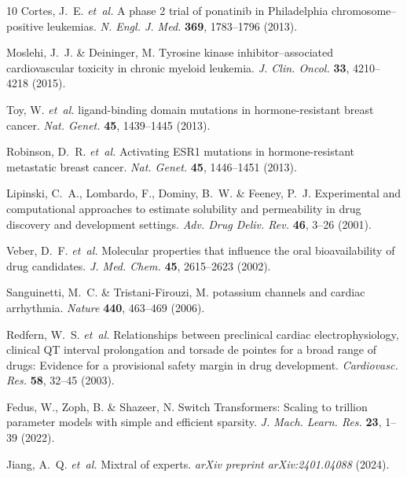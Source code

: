 \documentclass[11pt,a4paper]{article}
\begin{document}
\begin{thebibliography}{10}
Cortes, J.~E. \emph{et~al.}
\newblock A phase 2 trial of ponatinib in {Philadelphia} chromosome--positive leukemias.
\newblock \emph{N. Engl. J. Med.} \textbf{369}, 1783--1796 (2013).

Moslehi, J.~J. \& Deininger, M.
\newblock Tyrosine kinase inhibitor--associated cardiovascular toxicity in chronic myeloid leukemia.
\newblock \emph{J. Clin. Oncol.} \textbf{33}, 4210--4218 (2015).

Toy, W. \emph{et~al.}
 ligand-binding domain mutations in hormone-resistant breast cancer.
\newblock \emph{Nat. Genet.} \textbf{45}, 1439--1445 (2013).

Robinson, D.~R. \emph{et~al.}
\newblock Activating {ESR1} mutations in hormone-resistant metastatic breast cancer.
\newblock \emph{Nat. Genet.} \textbf{45}, 1446--1451 (2013).

Lipinski, C.~A., Lombardo, F., Dominy, B.~W. \& Feeney, P.~J.
\newblock Experimental and computational approaches to estimate solubility and permeability in drug discovery and development settings.
\newblock \emph{Adv. Drug Deliv. Rev.} \textbf{46}, 3--26 (2001).

Veber, D.~F. \emph{et~al.}
\newblock Molecular properties that influence the oral bioavailability of drug candidates.
\newblock \emph{J. Med. Chem.} \textbf{45}, 2615--2623 (2002).

Sanguinetti, M.~C. \& Tristani-Firouzi, M.
 potassium channels and cardiac arrhythmia.
\newblock \emph{Nature} \textbf{440}, 463--469 (2006).

Redfern, W.~S. \emph{et~al.}
\newblock Relationships between preclinical cardiac electrophysiology, clinical {QT} interval prolongation and torsade de pointes for a broad range of drugs: Evidence for a provisional safety margin in drug development.
\newblock \emph{Cardiovasc. Res.} \textbf{58}, 32--45 (2003).

Fedus, W., Zoph, B. \& Shazeer, N.
\newblock Switch Transformers: Scaling to trillion parameter models with simple and efficient sparsity.
\newblock \emph{J. Mach. Learn. Res.} \textbf{23}, 1--39 (2022).

Jiang, A.~Q. \emph{et~al.}
\newblock Mixtral of experts.
\newblock \emph{arXiv preprint arXiv:2401.04088} (2024).


\end{thebibliography}
\end{document}
